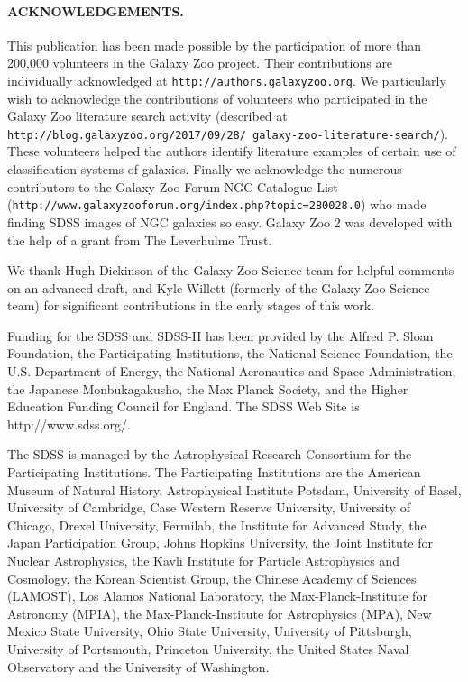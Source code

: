 \documentclass[usenatbib]{mn2e}
\begin{document}
\paragraph*{ACKNOWLEDGEMENTS.} 

This publication has been made possible by the participation of more than 200,000 volunteers in the Galaxy Zoo project. Their contributions are individually acknowledged at \texttt{http://authors.galaxyzoo.org}.  We particularly wish to acknowledge the contributions of volunteers who participated in the Galaxy Zoo literature search activity (described at {\tt http://blog.galaxyzoo.org/2017/09/28/ galaxy-zoo-literature-search/}). These volunteers helped the authors identify literature examples of certain use of classification systems of galaxies. Finally we acknowledge the numerous contributors to the Galaxy Zoo Forum NGC Catalogue List ({\tt http://www.galaxyzooforum.org/index.php?topic=280028.0}) who made finding SDSS images of NGC galaxies so easy. Galaxy Zoo 2 was developed with the help of a grant from The Leverhulme Trust.

We thank Hugh Dickinson of the Galaxy Zoo Science team for helpful comments on an advanced draft, and Kyle Willett (formerly of the Galaxy Zoo Science team) for significant contributions in the early stages of this work. 

Funding for the SDSS and SDSS-II has been provided by the Alfred P. Sloan Foundation, the Participating Institutions, the National Science Foundation, the U.S. Department of Energy, the National Aeronautics and Space Administration, the Japanese Monbukagakusho, the Max Planck Society, and the Higher Education Funding Council for England. The SDSS Web Site is http://www.sdss.org/. 

The SDSS is managed by the Astrophysical Research Consortium for the Participating Institutions. The Participating Institutions are the American Museum of Natural History, Astrophysical  Institute Potsdam, University of Basel, University of Cambridge, 
Case Western Reserve University, University of Chicago, Drexel University, Fermilab, the Institute for Advanced Study, the Japan 
Participation Group, Johns Hopkins University, the Joint Institute for Nuclear Astrophysics, the Kavli Institute for Particle Astrophysics and Cosmology, the Korean Scientist Group, the Chinese Academy of Sciences (LAMOST), Los Alamos National Laboratory, the Max-Planck-Institute for Astronomy (MPIA), the Max-Planck-Institute for Astrophysics (MPA), New Mexico State University, Ohio State University, University of Pittsburgh, University of Portsmouth, Princeton University, the United States Naval Observatory and the University of Washington. 
\end{document}
